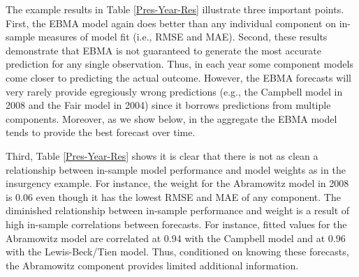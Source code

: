 

The example results in Table \ref{Pres-Year-Res} illustrate three
important points.  First, the EBMA model again does better than any
individual component on in-sample measures of model fit (i.e., RMSE
and MAE).  Second, these results demonstrate that EBMA is not
guaranteed to generate the most accurate prediction for any single
observation.  Thus, in each year some component models come closer to
predicting the actual outcome.  However, the EBMA forecasts will very
rarely provide egregiously wrong predictions (e.g., the Campbell model
in 2008 and the Fair model in 2004) since it borrows predictions from
multiple components.  Moreover, as we show below, in the aggregate the
EBMA model tends to provide the best forecast over time.

Third, Table \ref{Pres-Year-Res} shows it is clear that there is
not as clean a relationship between in-sample model performance and
model weights as in the insurgency example.  For instance, the weight
for the Abramowitz model in 2008 is 0.06 even though it has the lowest
RMSE and MAE of any component.  The diminished relationship between
in-sample performance and weight is a result of high in-sample
correlations between forecasts.  For
instance, fitted values for the Abramowitz model are correlated at
0.94 with the Campbell model and at 0.96 with the Lewis-Beck/Tien
model. Thus, conditioned on knowing these forecasts, the Abramowitz
component provides limited additional information.  

